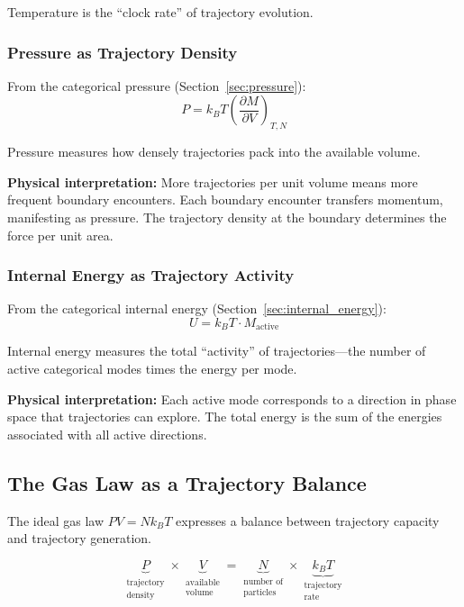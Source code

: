 Temperature is the ``clock rate'' of trajectory evolution.

\subsubsection{Pressure as Trajectory Density}

From the categorical pressure (Section~\ref{sec:pressure}):
\begin{equation}
P = k_B T \left(\frac{\partial M}{\partial V}\right)_{T,N}
\end{equation}

Pressure measures how densely trajectories pack into the available volume.

\textbf{Physical interpretation:} More trajectories per unit volume means more frequent boundary encounters. Each boundary encounter transfers momentum, manifesting as pressure. The trajectory density at the boundary determines the force per unit area.

\subsubsection{Internal Energy as Trajectory Activity}

From the categorical internal energy (Section~\ref{sec:internal_energy}):
\begin{equation}
U = k_B T \cdot M_{\text{active}}
\end{equation}

Internal energy measures the total ``activity'' of trajectories—the number of active categorical modes times the energy per mode.

\textbf{Physical interpretation:} Each active mode corresponds to a direction in phase space that trajectories can explore. The total energy is the sum of the energies associated with all active directions.

\subsection{The Gas Law as a Trajectory Balance}

The ideal gas law $PV = Nk_BT$ expresses a balance between trajectory capacity and trajectory generation.

\begin{equation}
\underbrace{P}_{\substack{\text{trajectory} \\ \text{density}}} \times \underbrace{V}_{\substack{\text{available} \\ \text{volume}}} = \underbrace{N}_{\substack{\text{number of} \\ \text{particles}}} \times \underbrace{k_BT}_{\substack{\text{trajectory} \\ \text{rate}}}
\end{equation}

